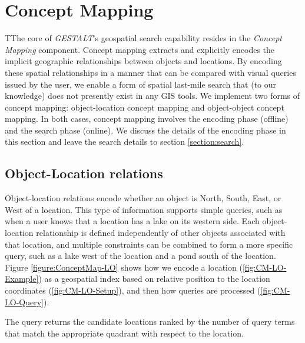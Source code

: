 \section{Concept Mapping}
\label{section:concept}

TThe core of \emph{GESTALT}'s geospatial search capability resides in the \emph{Concept Mapping} component.
Concept mapping extracts and explicitly encodes the implicit geographic relationships between objects and locations. 
By encoding these spatial relationships in a manner that can be compared with visual queries issued by the user, we enable a form of spatial last-mile search that (to our knowledge) does not presently exist in any GIS tools.
We implement two forms of concept mapping: object-location concept mapping and object-object concept mapping.
In both cases, concept mapping involves the encoding phase (offline) and the search phase (online). 
We discuss the details of the encoding phase in this section and leave the search details to section \ref{section:search}.


\subsection{Object-Location relations}
Object-location relations encode whether an object is North, South, East, or West of a location. 
This type of information supports simple queries, such as when a user knows that a location has a lake on its western side. 
Each object-location relationship is defined independently of other objects associated with that location, and multiple constraints can be combined to form a more specific query, such as a lake west of the location and a pond south of the location.
Figure \ref{figure:ConceptMap-LO} shows how we encode a location (\ref{fig:CM-LO-Example}) as a geospatial index based on relative position to the location coordinates (\ref{fig:CM-LO-Setup}), and then how queries are processed (\ref{fig:CM-LO-Query}).

The query returns the candidate locations ranked by the number of query terms that match the appropriate quadrant with respect to the location.  

